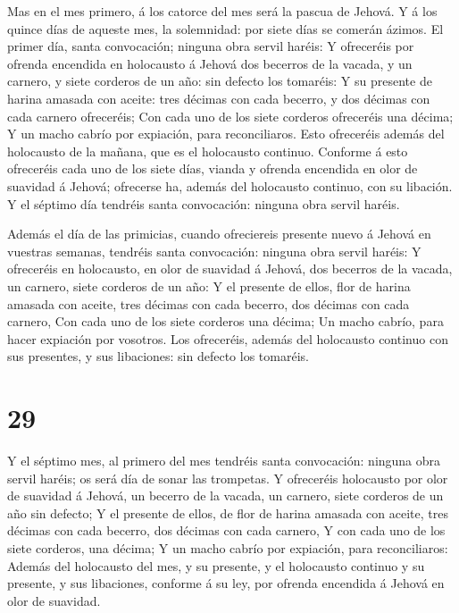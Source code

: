  Mas en el mes primero, á los catorce del mes será la
pascua de Jehová.  Y á los quince días de aqueste mes, la
solemnidad: por siete días se comerán ázimos.  El primer
día, santa convocación; ninguna obra servil haréis:  Y
ofreceréis por ofrenda encendida en holocausto á Jehová dos becerros de
la vacada, y un carnero, y siete corderos de un año: sin defecto los
tomaréis:  Y su presente de harina amasada con aceite: tres
décimas con cada becerro, y dos décimas con cada carnero ofreceréis;
 Con cada uno de los siete corderos ofreceréis una décima;
 Y un macho cabrío por expiación, para reconciliaros.
 Esto ofreceréis además del holocausto de la mañana, que es
el holocausto continuo.  Conforme á esto ofreceréis cada
uno de los siete días, vianda y ofrenda encendida en olor de suavidad á
Jehová; ofrecerse ha, además del holocausto continuo, con su libación.
 Y el séptimo día tendréis santa convocación: ninguna obra
servil haréis.

 Además el día de las primicias, cuando ofreciereis
presente nuevo á Jehová en vuestras semanas, tendréis santa convocación:
ninguna obra servil haréis:  Y ofreceréis en holocausto, en
olor de suavidad á Jehová, dos becerros de la vacada, un carnero, siete
corderos de un año:  Y el presente de ellos, flor de harina
amasada con aceite, tres décimas con cada becerro, dos décimas con cada
carnero,  Con cada uno de los siete corderos una décima;
 Un macho cabrío, para hacer expiación por vosotros.
 Los ofreceréis, además del holocausto continuo con sus
presentes, y sus libaciones: sin defecto los tomaréis.

\hypertarget{section-28}{%
\section{29}\label{section-28}}

 Y el séptimo mes, al primero del mes tendréis santa
convocación: ninguna obra servil haréis; os será día de sonar las
trompetas.  Y ofreceréis holocausto por olor de suavidad á
Jehová, un becerro de la vacada, un carnero, siete corderos de un año
sin defecto;  Y el presente de ellos, de flor de harina
amasada con aceite, tres décimas con cada becerro, dos décimas con cada
carnero,  Y con cada uno de los siete corderos, una décima;
 Y un macho cabrío por expiación, para reconciliaros:
 Además del holocausto del mes, y su presente, y el
holocausto continuo y su presente, y sus libaciones, conforme á su ley,
por ofrenda encendida á Jehová en olor de suavidad.

